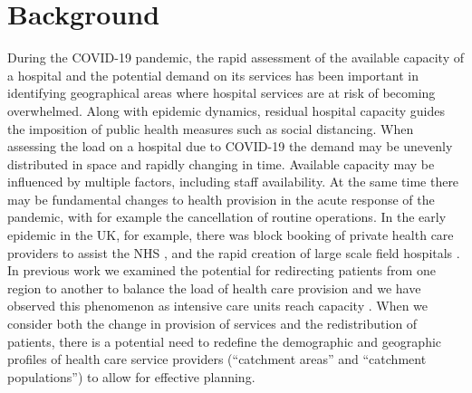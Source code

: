 \documentclass[twocolumn]{bmcart}%
\begin{document}


\section*{Background}

During the COVID-19 pandemic, the rapid assessment of the available capacity of a hospital and the potential demand on 
its services has been important in identifying geographical areas where hospital services are at risk of becoming 
overwhelmed. Along with epidemic dynamics, residual hospital capacity guides the imposition of public health measures 
such as social distancing. When assessing the load on a hospital due to COVID-19 the demand may be unevenly distributed 
in space and rapidly changing in time. Available capacity may be influenced by multiple factors, including staff 
availability. At the same time there may be fundamental changes to health provision in the acute response of the 
pandemic, with for example the cancellation of routine operations. In the early epidemic in the UK, for example, there 
was block booking of private health care providers to assist the NHS \cite{CoronavirusThousandsExtra2020}, and the 
rapid creation of large scale field hospitals \cite{CoronavirusNightingaleHospital2020}. In previous work we examined 
the potential for redirecting patients from one region to another to balance the load of health care provision 
\cite{lacasaFlexibleMethodOptimising2020} and we have observed this phenomenon as intensive care units reach capacity 
\cite{pettCriticalCareTransfers2020}. When we consider both the change in provision of services and the redistribution 
of patients, there is a potential need to redefine the demographic and geographic profiles of health care service 
providers (``catchment areas'' and ``catchment populations'') \cite{jonesModellingCatchmentAreas2011} to allow for 
effective planning.
\end{document}
